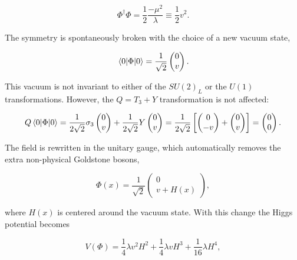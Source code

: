 \begin{equation}
    \Phi^\dag\Phi=\frac{1}{2}\frac{-\mu^2}{\lambda}\equiv\frac{1}{2}v^2.
\end{equation}

The symmetry is spontaneously broken with the choice of a new vacuum state,

\begin{equation}
    \expval{\Phi}{0} =\frac{1}{\sqrt{2}}\begin{pmatrix}
    0\\v
    \end{pmatrix}.
\end{equation}

This vacuum is not invariant to either of the $SU(2)_L$ or the $U(1)$ transformations. However, the $Q=T_3+Y$ transformation is not affected:

\begin{equation}
    Q\expval{\Phi}{0} = \frac{1}{2\sqrt{2}}\sigma_3\begin{pmatrix}0\\v\end{pmatrix}+\frac{1}{2\sqrt{2}}Y\begin{pmatrix}0\\v\end{pmatrix} = \frac{1}{2\sqrt{2}}\left[ 
    \begin{pmatrix} 0 \\ -v  \end{pmatrix} +
    \begin{pmatrix} 0 \\ v  \end{pmatrix}\right] = \begin{pmatrix}
    0\\0
    \end{pmatrix}.
\end{equation}

The field is rewritten in the unitary gauge, which automatically removes the extra non-physical Goldstone bosons,

\begin{equation}
    \Phi(x) = \frac{1}{\sqrt{2}}\begin{pmatrix}
    0 \\ v+H(x)
    \end{pmatrix},
\end{equation}

where $H(x)$ is centered around the vacuum state. With this change the Higgs potential becomes

\begin{equation}
    V(\Phi) =\frac{1}{4}\lambda v^2 H^2 + \frac{1}{4} \lambda v H^3 + \frac{1}{16} \lambda H^4,
\end{equation}

